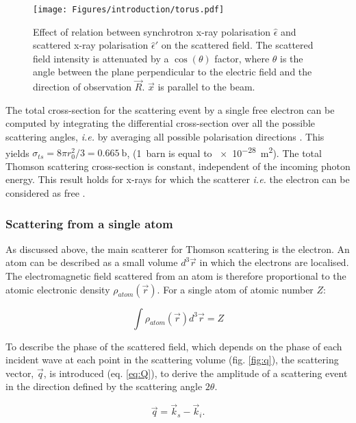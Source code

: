 \begin{figure}[!htb]
    \centering
    \texttt{[image: Figures/introduction/torus.pdf]}
    \caption{
        Effect of relation between synchrotron x-ray polarisation $\hat{\epsilon}$ and scattered x-ray polarisation $\hat{\epsilon}'$ on the scattered field.
        The scattered field intensity is attenuated by a $\cos{(\theta)}$ factor, where $\theta$ is the angle between the plane perpendicular to the electric field and the direction of observation $\vec{R}$.
        $\vec{x}$ is parallel to the beam.
    }
    \label{fig:PolarisationEffect}
\end{figure}

The total cross-section for the scattering event by a single free electron can be computed by integrating the differential cross-section over all the possible scattering angles, \textit{i.e.} by averaging all possible polarisation directions \parencite{Willmott}.
This yields $\sigma_{ts} = 8 \pi r_0^2 /3 = \qty{0.665}{\barn}$, (\qty{1}{barn} is equal to \qty{e-28}{\m^2}).
The total Thomson scattering cross-section is constant, independent of the incoming photon energy.
This result holds for x-rays for which the scatterer \textit{i.e.} the electron can be considered as free \parencite{Willmott}.

\subsubsection{Scattering from a single atom}\label{sec:scattering}

As discussed above, the main scatterer for Thomson scattering is the electron.
An atom can be described as a small volume $d^3\vec{r}$ in which the electrons are localised.
The electromagnetic field scattered from an atom is therefore proportional to the atomic electronic density $\rho_{atom}(\vec{r})$.
For a single atom of atomic number $Z$:

\begin{equation}
    \int \rho_{atom} (\vec{r}) d^3\vec{r} = Z
\end{equation}

To describe the phase of the scattered field, which depends on the phase of each incident wave at each point in the scattering volume (fig. \ref{fig:q}), the scattering vector, $\vec{q}$, is introduced (eq. \ref{eq:Q}), to derive the amplitude of a scattering event in the direction defined by the scattering angle $2\theta$.

\begin{equation}
    \label{eq:Q}
    \vec{q}=\vec{k}_s-\vec{k}_i.
\end{equation}

